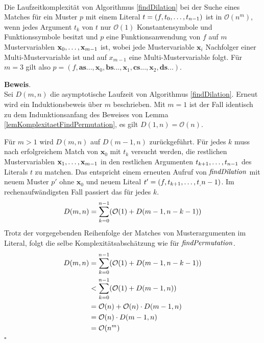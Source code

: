 \begin{lemma}\label{lemKomplexitaetDilation}~\\
Die Laufzeitkomplexität von Algorithmus \ref{findDilation} bei der Suche eines Matches für ein Muster $p$  mit einem Literal $t = (f, {t}_{0}, \dots, {t}_{n-1})$ ist in $\mathcal O(n^m)$, wenn jedes Argument $t_k$ von $t$ nur $\mathcal O(1)$ Konstantensymbole und Funktionssymbole besitzt und $p$ eine Funktionsanwendung von $f$ auf $m$ Mustervariablen ${\mathbf x}_{0}, \dots, {\mathbf x}_{m-1}$ ist, 
wobei jede Mustervariable $\mathbf x_i$ Nachfolger einer Multi-Mustervariable ist und auf $x_{m-1}$ eine Multi-Mustervariable folgt. Für $m = 3$ gilt also $p = (f, \mathbf{as...}, \mathbf x_0, \mathbf{bs...}, \mathbf x_1, \mathbf{cs...}, \mathbf x_2, \mathbf{ds...})$.
\end{lemma}

\textbf{Beweis}.\\
Sei $D(m, n)$ die asymptotische Laufzeit von Algorithmus \ref{findDilation}. Erneut wird ein Induktionsbeweis über $m$ beschrieben.
Mit $m = 1$ ist der Fall identisch zu dem Indunktionsanfang des Beweises von Lemma \ref{lemKomplexitaetFindPermutation}, es gilt $D(1, n) = \mathcal O(n)$. 

Für $m > 1$ wird $D(m, n)$ auf $D(m-1, n)$ zurückgeführt. Für jedes $k$ muss nach erfolgreichem Match von $\mathbf x_0$ mit $t_k$ versucht werden, die restlichen Mustervariablen ${\mathbf x}_{1}, \dots, {\mathbf x}_{m-1}$ in den restlichen Argumenten ${t}_{k+1}, \dots, {t}_{n-1}$ des Literals $t$ zu matchen. Das entspricht einem erneuten Aufruf von $\mathit{findDilation}$ mit neuem Muster $p'$ ohne $\mathbf x_0$ und neuem Liteal $t' = (f, {t}_{k+1}, \dots, {t}_{,} {n-1})$.
Im rechenaufwändigsten Fall passiert das für jedes $k$.
$$D(m, n) = \sum_{k = 0}^{n-1} \paren*{\mathcal O(1) + D(m-1, n - k - 1)}$$
Trotz der vorgegebenden Reihenfolge der Matches von Musterargumenten im Literal, folgt die selbe Komplexitätsabschätzung wie für $\mathit{findPermutation}$.
\begin{equation*}
	\begin{split} 
		D(m, n) 
		&= \sum_{k = 0}^{n-1} \paren*{\mathcal O(1) + D(m-1, n - k - 1)}\\ 
		&< \sum_{k = 0}^{n-1} \paren*{\mathcal O(1) + D(m-1, n)}\\
		&= \mathcal O(n) + \mathcal O(n) \cdot D(m-1, n)\\
		&= \mathcal O(n) \cdot D(m-1, n)\\
		&= \mathcal O(n^m)
	\end{split}
\end{equation*}
\hfill $\square$\\


